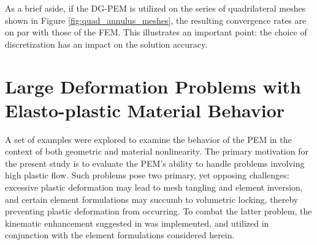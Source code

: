 As a brief aside, if the DG-PEM is utilized on the series of quadrilateral meshes shown in Figure \ref{fig:quad_annulus_meshes}, the resulting convergence rates are on par with those of the FEM. This illustrates an important point: the choice of discretization has an impact on the solution accuracy.

%
%
%
%



\section{Large Deformation Problems with Elasto-plastic Material Behavior}

A set of examples were explored to examine the behavior of the PEM in the context of both geometric and material nonlinearity. The primary motivation for the present study is to evaluate the PEM's ability to handle problems involving high plastic flow. Such problems pose two primary, yet opposing challenges: excessive plastic deformation may lead to mesh tangling and element inversion, and certain element formulations may succumb to volumetric locking, thereby preventing plastic deformation from occurring. To combat the latter problem, the kinematic enhancement suggested in \cite{Rashid:06} was implemented, and utilized in conjunction with the element formulations considered herein.

